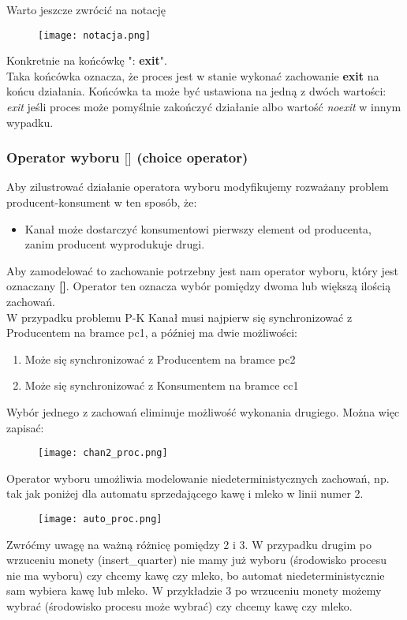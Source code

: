 \documentclass[a4paper,15pt]{article}
\begin{document}
Warto jeszcze zwrócić na notację 
\begin{figure}[H]
\centerline{\texttt{[image: notacja.png]}}
\label{fig:chan1_proc}
\end{figure}
Konkretnie na końcówkę ":\textbf{ exit}". \\
Taka końcówka oznacza, że proces jest w stanie wykonać zachowanie \textbf{exit} na końcu działania. Końcówka ta może być ustawiona na jedną z dwóch wartości: \textit{exit} jeśli proces może pomyślnie zakończyć działanie albo wartość \textit{noexit} w innym wypadku. 



\newpage
\subsubsection{Operator wyboru $\lbrack \rbrack$ (choice operator)} 

Aby zilustrować działanie operatora wyboru modyfikujemy rozważany problem producent-konsument w ten sposób, że:
\begin{itemize}
\item Kanał może dostarczyć konsumentowi pierwszy element od producenta, zanim producent wyprodukuje drugi.
\end{itemize}
Aby zamodelować to zachowanie potrzebny jest nam operator wyboru, który jest oznaczany \textbf{[]}. Operator ten oznacza wybór pomiędzy dwoma lub większą ilością zachowań. \\
W przypadku problemu P-K Kanał musi najpierw się synchronizować z Producentem na bramce pc1, a później ma dwie możliwości: 
\begin{enumerate}
\item Może się synchronizować z Producentem na bramce pc2 
\item Może się synchronizować z Konsumentem na bramce cc1
\end{enumerate}
Wybór jednego z zachowań eliminuje możliwość wykonania drugiego. Można więc zapisać: 


\begin{figure}[H]
\centerline{\texttt{[image: chan2\_proc.png]}}
\label{fig:chan2_proc}
\end{figure}

Operator wyboru umożliwia modelowanie niedeterministycznych zachowań, np. tak jak poniżej dla automatu sprzedającego kawę i mleko w linii numer 2.

\begin{figure}[H]
\centerline{\texttt{[image: auto\_proc.png]}}
\label{fig:auto_proc}
\end{figure}
Zwróćmy uwagę na ważną różnicę pomiędzy 2 i 3. W przypadku drugim po wrzuceniu monety (insert\_quarter) nie mamy już wyboru (środowisko procesu nie ma wyboru) czy chcemy kawę czy mleko, bo automat niedeterministycznie sam wybiera kawę lub mleko. W przykładzie 3 po wrzuceniu monety możemy wybrać (środowisko procesu może wybrać) czy chcemy kawę czy mleko.
\end{document}
